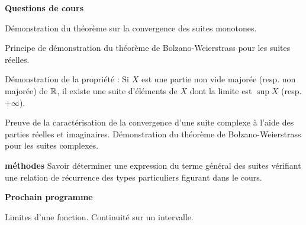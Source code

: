 








\bigskip
\begin{center}
 \textbf{Questions de cours}
\end{center}
Démonstration du théorème sur la convergence des suites monotones.

Principe de démonstration du théorème de Bolzano-Weierstrass pour les suites réelles.

Démonstration de la propriété : \og Si $X$ est une partie non vide majorée (resp. non majorée) de $\mathbb{R}$, il existe une suite d'éléments de $X$ dont la limite est $\sup X$ (resp. $+\infty$).\fg

Preuve de la caractérisation de la convergence d'une suite complexe à l'aide des parties réelles et imaginaires. Démonstration du théorème de Bolzano-Weierstrass pour les suites complexes.

\textbf{méthodes}\newline
Savoir déterminer une expression du terme général des suites vérifiant une relation de récurrence des types particuliers figurant dans le cours.
\begin{center}
 \textbf{Prochain programme}
\end{center}
Limites d'une fonction. Continuité sur un intervalle.

